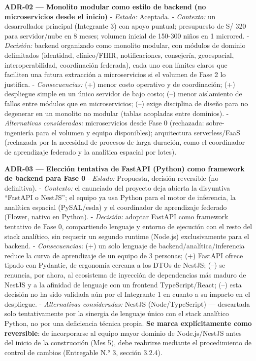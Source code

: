 \documentclass[11pt,a4paper]{article}
\begin{document}
\textbf{ADR-02 --- Monolito modular como estilo de backend (no microservicios desde el inicio)}
- \emph{Estado:} Aceptada.
- \emph{Contexto:} un desarrollador principal (Integrante 3) con apoyo puntual; presupuesto de S/ 320 para servidor/nube en 8 meses; volumen inicial de 150-300 niños en 1 microred.
- \emph{Decisión:} backend organizado como monolito modular, con módulos de dominio delimitados (identidad, clínico/FHIR, notificaciones, consejería, geoespacial, interoperabilidad, coordinación federada), cada uno con límites claros que faciliten una futura extracción a microservicios si el volumen de Fase 2 lo justifica.
- \emph{Consecuencias:} (+) menor costo operativo y de coordinación; (+) despliegue simple en un único servidor de bajo costo; (--) menor aislamiento de fallos entre módulos que en microservicios; (--) exige disciplina de diseño para no degenerar en un monolito no modular (tablas acopladas entre dominios).
- \emph{Alternativas consideradas:} microservicios desde Fase 0 (rechazada: sobre-ingeniería para el volumen y equipo disponibles); arquitectura serverless/FaaS (rechazada por la necesidad de procesos de larga duración, como el coordinador de aprendizaje federado y la analítica espacial por lotes).

\textbf{ADR-03 --- Elección tentativa de FastAPI (Python) como framework de backend para Fase 0}
- \emph{Estado:} Propuesta, decisión reversible (no definitiva).
- \emph{Contexto:} el enunciado del proyecto deja abierta la disyuntiva ``FastAPI o NestJS''; el equipo ya usa Python para el motor de inferencia, la analítica espacial (PySAL/esda) y el coordinador de aprendizaje federado (Flower, nativo en Python).
- \emph{Decisión:} adoptar FastAPI como framework tentativo de Fase 0, compartiendo lenguaje y entorno de ejecución con el resto del stack analítico, sin requerir un segundo runtime (Node.js) exclusivamente para el backend.
- \emph{Consecuencias:} (+) un solo lenguaje de backend/analítica/inferencia reduce la curva de aprendizaje de un equipo de 3 personas; (+) FastAPI ofrece tipado con Pydantic, de ergonomía cercana a los DTOs de NestJS; (--) se renuncia, por ahora, al ecosistema de inyección de dependencias más maduro de NestJS y a la afinidad de lenguaje con un frontend TypeScript/React; (--) esta decisión no ha sido validada aún por el Integrante 1 en cuanto a su impacto en el despliegue.
- \emph{Alternativas consideradas:} NestJS (Node/TypeScript) --- descartada solo tentativamente por la sinergia de lenguaje único con el stack analítico Python, no por una deficiencia técnica propia. \textbf{Se marca explícitamente como reversible}: de incorporarse al equipo mayor dominio de Node.js/NestJS antes del inicio de la construcción (Mes 5), debe reabrirse mediante el procedimiento de control de cambios (Entregable N.° 3, sección 3.2.4).
\end{document}
